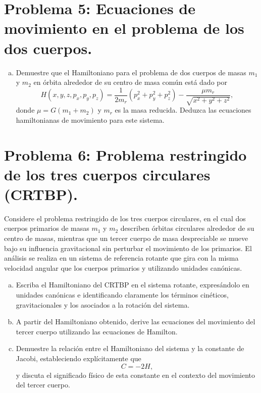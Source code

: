 \documentclass[a4paper]{article}
\begin{document}
\section{Problema 5: Ecuaciones de movimiento en el problema de los dos cuerpos.}

\begin{enumerate}[a)]
    \item Demuestre que el Hamiltoniano para el problema de dos cuerpos de masas $m_1$ y $m_2$ en órbita alrededor de su centro de masa común está dado por
    $$H(x, y, z, p_x, p_y, p_z) = \frac{1}{2m_r} \left(p_x^2 + p_y^2 + p_z^2\right) - \frac{\mu m_r}{\sqrt{x^2 + y^2 + z^2}},$$
    donde $\mu = G(m_1 + m_2)$ y $m_r$ es la masa reducida. Deduzca las ecuaciones hamiltonianas de movimiento para este sistema.
\end{enumerate}

\section{Problema 6: Problema restringido de los tres cuerpos circulares (CRTBP).}

Considere el problema restringido de los tres cuerpos circulares, en el cual dos cuerpos primarios de masas $m_1$ y $m_2$ describen órbitas circulares alrededor de su centro de masas, mientras que un tercer cuerpo de masa despreciable se mueve bajo su influencia gravitacional sin perturbar el movimiento de los primarios. El análisis se realiza en un sistema de referencia rotante que gira con la misma velocidad angular que los cuerpos primarios y utilizando unidades canónicas.

\begin{enumerate}[a)]
    \item Escriba el Hamiltoniano del CRTBP en el sistema rotante, expresándolo en unidades canónicas e identificando claramente los términos cinéticos, gravitacionales y los asociados a la rotación del sistema.
    
    \item A partir del Hamiltoniano obtenido, derive las ecuaciones del movimiento del tercer cuerpo utilizando las ecuaciones de Hamilton.
    
    \item Demuestre la relación entre el Hamiltoniano del sistema y la constante de Jacobi, estableciendo explícitamente que
    $$C = -2H,$$
    y discuta el significado físico de esta constante en el contexto del movimiento del tercer cuerpo.
\end{enumerate}
\end{document}
